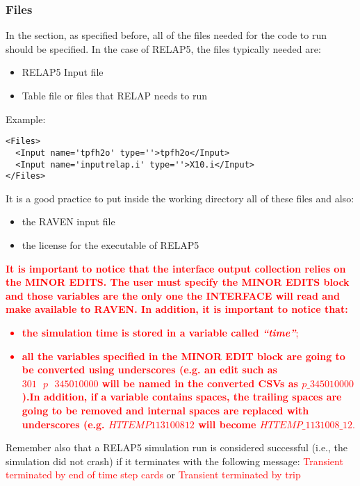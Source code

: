 \subsubsection{Files}
In the  section, as specified before, all of the files needed for
the code to run should be specified.
%
In the case of RELAP5, the files typically needed are:
\begin{itemize}
  \item RELAP5 Input file
  \item Table file or files that RELAP needs to run
\end{itemize}
Example:
\begin{lstlisting}[style=XML]
<Files>
  <Input name='tpfh2o' type=''>tpfh2o</Input>
  <Input name='inputrelap.i' type=''>X10.i</Input>
</Files>
\end{lstlisting}

It is a good practice to put inside the working directory all of these files and
also:
\begin{itemize}
  \item the RAVEN input file
  \item the license for the executable of RELAP5
\end{itemize}
\textcolor{red}{
\textbf{It is important to notice that the interface output collection relies on the MINOR EDITS. The user must specify the MINOR
EDITS block and those variables are the only one the INTERFACE will read and make available to RAVEN. In addition, it is important to notice that:}
\begin{itemize}
  \item \textbf{the simulation time is stored in a variable called \textit{``time''}};
  \item \textbf{all the variables specified in the MINOR EDIT block are going to be converted using underscores (e.g.  an edit such as
  $301 \:\:\: p \:\:\: 345010000$ will be named in the converted CSVs as $p\_345010000$).In addition, if a variable contains spaces, the trailing spaces
   are going to be removed and internal spaces are replaced with underscores (e.g. $HTTEMP 1131008 12$ will become $HTTEMP\_1131008\_12$}.
\end{itemize}
}

Remember also that a RELAP5 simulation run is considered successful (i.e., the simulation did not crash) if it terminates with the following
message:
\textcolor{red}{Transient terminated by end of time step cards}
or
\textcolor{red}{Transient terminated by trip}

